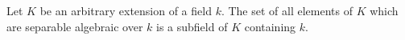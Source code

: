 Let $K$ be an arbitrary extension of a field $k$. The set of all elements of $K$ which are separable algebraic over $k$ is a subfield of $K$ containing $k$.

